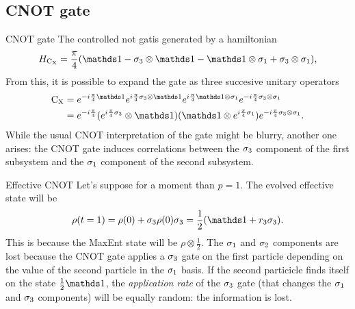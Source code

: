 \subsection{CNOT gate}

\begin{frame}{CNOT gate}
    The controlled not gatis generated by a hamiltonian
    \begin{equation*}
        H_{\cnot}=\frac{\pi}{4}\qty(\Id-\pauli{3}\otimes\Id-\Id\otimes\pauli{1}+\pauli{3}\otimes\pauli{1}),
    \end{equation*}
    From this, it is possible to expand the gate as three succesive unitary operators
    \begin{align*}
        \cnot&=e^{-i\frac{\pi}{4}\Id}e^{i\frac{\pi}{4}\pauli{3}\otimes\Id}e^{i\frac{\pi}{4}\Id\otimes\pauli{1}}e^{-i\frac{\pi}{4}\pauli{3}\otimes\pauli{1}}\\
        &=e^{-i\frac{\pi}{4}} (e^{i\frac{\pi}{4}\pauli{3}}\otimes \Id) (\Id \otimes e^{i\frac{\pi}{4}\pauli{1}}) e^{-i\frac{\pi}{4}\pauli{3}\otimes\pauli{1}}.
    \end{align*}
    While the usual CNOT interpretation of the gate might be blurry, another one arises: the CNOT gate induces correlations between the $\sigma_{3}$ component of the first subsystem and the $\sigma_{1}$ component of the second subsystem.
\end{frame}

\begin{frame}{Effective CNOT}
    Let's suppose for a moment than $p=1$. The evolved effective state will be
    \begin{equation*}
      \rho(t=1)=\rho(0)+\pauli{3}\rho(0)\pauli{3}=\frac{1}{2}(\Id+r_{3}\pauli{3}).
    \end{equation*}
    This is because the MaxEnt state will be $\rho\otimes\frac{1}{2}$. The $\sigma_{1}$ and $\sigma_{2}$ components are lost because the CNOT gate applies a $\sigma_{3}$ gate on the first particle depending on the value of the second particle in the $\sigma_{1}$ basis. If the second particicle finds itself on the state $\frac{1}{2}\Id$, the \textit{application rate} of the $\sigma_{3}$ gate (that changes the $\sigma_{1}$ and $\sigma_{3}$ components) will be equally random: the information is lost.
\end{frame}

